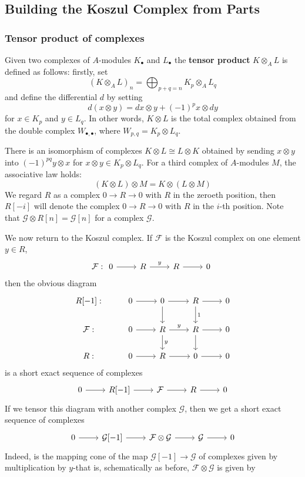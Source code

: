 \subsection{Building the Koszul Complex from Parts}
\subsubsection{Tensor product of complexes}
Given two complexes of $A$-modules $K_\bullet$ and $L_\bullet$ the \textbf{tensor product} $K\otimes_AL$ is defined as follows: firstly, set
\[(K\otimes_AL)_n=\bigoplus_{p+q=n}K_p\otimes_AL_q\]
and define the differential $d$ by setting
\[d(x\otimes y)=dx\otimes y+(-1)^px\otimes dy\]
for $x\in K_p$ and $y\in L_q$. In other words, $K\otimes L$ is the total complex obtained from the double complex $W_{\bullet,\bullet}$, where $W_{p,q}=K_p\otimes L_q$.\par
There is an isomorphism of complexes $K\otimes L\cong L\otimes K$ obtained by sending $x\otimes y$ into $(-1)^{pq}y\otimes x$ for $x\otimes y\in K_p\otimes L_q$. For a third complex of $A$-modules $M$, the associative law holds:
\[(K\otimes L)\otimes M=K\otimes(L\otimes M)\]
We regard $R$ as a complex $0\to R\to 0$ with $R$ in the zeroeth position, then $R[-i]$ will denote the complex $0\to R\to 0$ with $R$ in the $i$-th position. Note that $\mathcal{G}\otimes R[n]=\mathcal{G}[n]$ for a complex $\mathcal{G}$.\par
We now return to the Koszul complex. If $\mathcal{F}$ is the Koszul complex on one element $y\in R$,
\[\mathcal{F}:\begin{tikzcd}
0\ar[r]&R\ar[r,"y"]&R\ar[r]&0
\end{tikzcd}\]
then the obvious diagram 
\[\begin{tikzcd}
R[-1]:&0\ar[r]&0\ar[r]\ar[d]&R\ar[r]\ar[d,"1"]&0\\
\mathcal{F}:&0\ar[r]&R\ar[r,"y"]\ar[d,"y"]&R\ar[r]\ar[d]&0\\
R:&0\ar[r]&R\ar[r]&0\ar[r]&0
\end{tikzcd}\]
is a short exact sequence of complexes
\[\begin{tikzcd}
0\ar[r]&R[-1]\ar[r]&\mathcal{F}\ar[r]&R\ar[r]&0
\end{tikzcd}\]
If we tensor this diagram with another complex $\mathcal{G}$, then we get a short exact sequence of complexes 
\[\begin{tikzcd}
0\ar[r]&\mathcal{G}[-1]\ar[r]&\mathcal{F}\otimes\mathcal{G}\ar[r]&\mathcal{G}\ar[r]&0
\end{tikzcd}\]
Indeed, is the mapping cone of the map $\mathcal{G}[-1]\to\mathcal{G}$ of complexes given by multiplication by $y$-that is, schematically as before, $\mathcal{F}\otimes\mathcal{G}$ is given by
